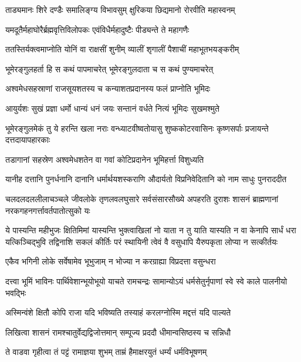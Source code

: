 \twolineshloka
{ताड्यमानः शिरे दण्डैः समालिङ्ग्य विभावसुम्}
{क्षुरिकया छिद्यमानो रोरवीति महास्वनम्}%

\twolineshloka
{यमदूतैर्महाघोरैर्ब्रह्मवृत्तिविलोपकः}
{एवंविधैर्महादुष्टैः पीड्यन्ते ते महागणैः}%

\twolineshloka
{ततस्तिर्यक्त्वमाप्नोति योनिं वा राक्षसीं शुनीम्}
{व्यालीं शृगालीं पैशाचीं महाभूतभयङ्करीम्}%

\twolineshloka
{भूमेरङ्गुलहर्ता हि स कथं पापमाचरेत्}
{भूमेरङ्गुलदाता च स कथं पुण्यमाचरेत्}%

\twolineshloka
{अश्वमेधसहस्राणां राजसूयशतस्य च}
{कन्याशतप्रदानस्य फलं प्राप्नोति भूमिदः}%

\twolineshloka
{आयुर्यशः सुखं प्रज्ञा धर्मो धान्यं धनं जयः}
{सन्तानं वर्धते नित्यं भूमिदः सुखमश्मुते}%

\threelineshloka
{भूमेरङ्गुलमेकं तु ये हरन्ति खला नराः}
{वन्ध्याटवीष्वतोयासु शुष्ककोटरवासिनः}
{कृष्णसर्पाः प्रजायन्ते दत्तदायापहारकाः}%

\twolineshloka
{तडागानां सहस्रेण अश्वमेधशतेन वा}
{गवां कोटिप्रदानेन भूमिहर्त्ता विशुध्यति}%

\twolineshloka
{यानीह दत्तानि पुनर्धनानि दानानि धर्मार्थयशस्कराणि}
{औदार्यतो विप्रनिवेदितानि को नाम साधुः पुनराददीत}%

\twolineshloka
{चलदलदललीलाचञ्चले जीवलोके तृणलवलघुसारे सर्वसंसारसौख्ये}
{अपहरति दुराशः शासनं ब्राह्मणानां नरकगहनगर्त्तावर्तपातोत्सुको यः}%

\twolineshloka
{ये पास्यन्ति महीभुजः क्षितिमिमां यास्यन्ति भुक्त्वाखिलां नो याता न तु याति यास्यति न वा केनापि सार्धं धरा}
{यत्किञ्चिद्भुवि तद्विनाशि सकलं कीर्तिः परं स्थायिनी त्वेवं वै वसुधापि यैरुपकृता लोप्या न सत्कीर्तयः}%

\twolineshloka
{एकैव भगिनी लोके सर्वेषामेव भूभुजाम्}
{न भोज्या न करग्राह्या विप्रदत्ता वसुन्धरा}%

\twolineshloka
{दत्त्वा भूमिं भाविनः पार्थिवेशान्भूयोभूयो याचते रामचन्द्रः}
{सामान्योऽयं धर्मसेतुर्नृपाणां स्वे स्वे काले पालनीयो भवद्भिः}%

\twolineshloka
{अस्मिन्वंशे क्षितौ कोपि राजा यदि भविष्यति}
{तस्याहं करलग्नोस्मि मद्दत्तं यदि पाल्यते}%

\twolineshloka
{लिखित्वा शासनं रामश्चातुर्वेद्यद्विजोत्तमान्}
{सम्पूज्य प्रददौ धीमान्वसिष्ठस्य च सन्निधौ}%

\twolineshloka
{ते वाडवा गृहीत्वा तं पट्टं रामाज्ञया शुभम्}
{ताम्रं हैमाक्षरयुतं धर्म्यं धर्मविभूषणम्}%

